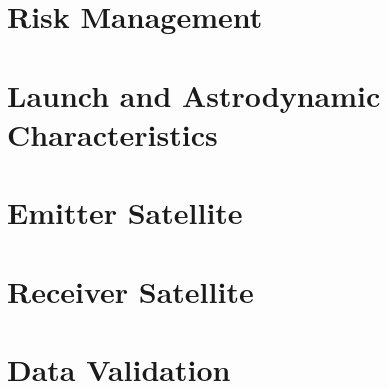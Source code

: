 \documentclass[11pt]{report}
\begin{document}
%
%

\chapter{Risk Management}
\label{chap:risk_management}
%

%
%
\chapter{Launch and Astrodynamic Characteristics}
\label{chap:astrodynamics}


%
%

\chapter{Emitter Satellite}
\label{chap:emitter}






%
%
	
\chapter{Receiver Satellite}
\label{chap:receiver}







%
%

\chapter{Data Validation}
\label{chap:sim}





%
%






%
%


\end{document}
